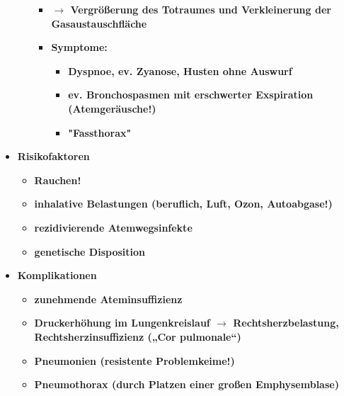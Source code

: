 \begin{itemize}
\begin{itemize}
\begin{itemize}
								\item \textbf{$\rightarrow$ Vergrößerung des Totraumes und Verkleinerung der Gasaustauschfläche}
								\item \textbf{Symptome:}
									\begin{itemize}
										\item \textbf{Dyspnoe, ev. Zyanose, Husten ohne Auswurf}
										\item \textbf{ev. Bronchospasmen mit erschwerter Exspiration (Atemgeräusche!)}
										\item \textbf{"Fassthorax"}
									\end{itemize}
							\end{itemize}
					\end{itemize}
				\item \textbf{Risikofaktoren}
					\begin{itemize}
						\item \textbf{Rauchen!}
						\item \textbf{inhalative Belastungen (beruflich, Luft, Ozon, Autoabgase!)}
						\item \textbf{rezidivierende Atemwegsinfekte}
						\item \textbf{genetische Disposition}
					\end{itemize}
				\item \textbf{Komplikationen}
					\begin{itemize}
						\item \textbf{zunehmende Ateminsuffizienz}
						\item \textbf{Druckerhöhung im Lungenkreislauf $\rightarrow$ Rechtsherzbelastung, Rechtsherzinsuffizienz („Cor pulmonale“)}
						\item \textbf{Pneumonien (resistente Problemkeime!)}
						\item \textbf{Pneumothorax (durch Platzen einer großen Emphysemblase)}
					\end{itemize}
			\end{itemize}
